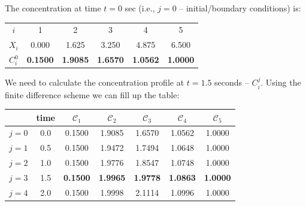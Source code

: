 \documentclass[calculator,datasheet,solutions]{exam}
\begin{document}
\begin{question}
\begin{enumerate}[(a)]
{The concentration at time $t = 0 $ sec (i.e., $j=0$ --  initial/boundary conditions) is:~

\begin{tabular}{ c c c c c c }
\hline
   $i$       & 1       &   2     &   3    &   4    &  5     \\ 
   $X_{i}$     & 0.000  &  1.625  & 3.250  & 4.875  & 6.500  \\
{\bf $C_{i}^{0}$}    & {\bf 0.1500}  & {\bf 1.9085}  & {\bf 1.6570} & {\bf 1.0562} & {\bf 1.0000} \\
\hline
\end{tabular}

We need to calculate the concentration profile at $t=1.5$ seconds -- $C_{i}^{j}$.  Using the finite difference scheme we can fill up the table:~
\begin{center}
\begin{tabular}{| c c | c c c c c|}
\hline 
        & time     & $\mathcal{C}_{1}$  & $\mathcal{C}_{2}$ &  $\mathcal{C}_{3}$ &  $\mathcal{C}_{4}$  & $\mathcal{C}_{5}$ \\
\hline
$j = 0$ & 0.0      & 0.1500            & 1.9085           & 1.6570            &  1.0562             & 1.0000            \\
$j = 1$ & 0.5      & 0.1500            & 1.9472           & 1.7494            &  1.0648             & 1.0000            \\
$j = 2$ & 1.0      & 0.1500            & 1.9776           & 1.8547            &  1.0748             & 1.0000            \\
$j = 3$ & 1.5      & {\bf 0.1500}      & {\bf 1.9965}     & {\bf 1.9778}      &  {\bf 1.0863}       & {\bf 1.0000 }     \\
$j = 4$ & 2.0      & 0.1500            & 1.9998           & 2.1114            &  1.0996             & 1.0000            \\
\hline
\end{tabular}
\end{center}
}


\end{enumerate}
\end{question}
\end{document}
